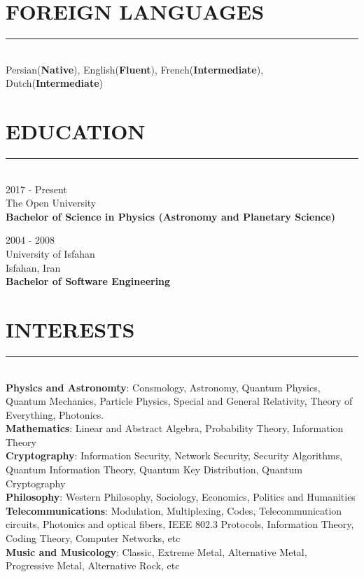 \documentclass[10pt,a4paper]{article}
\begin{document}

\section{FOREIGN LANGUAGES}
\noindent \rule {5.5cm}{0.4pt} \\
    Persian(\textbf{Native}),
    English(\textbf{Fluent}),
    French(\textbf{Intermediate}),
    Dutch(\textbf{Intermediate})

\section{EDUCATION}
\noindent \rule {3.0cm}{0.4pt} \\
\textbullet \hspace{0.1cm} 2017 - Present \\
The Open University \\
\textbf{Bachelor of Science in Physics (Astronomy and Planetary Science)}
\vspace{0.3cm}

\noindent \textbullet \hspace{0.1cm}  2004 - 2008 \\
University of Isfahan \\
Isfahan, Iran \\
\textbf{Bachelor of Software Engineering}


\section{INTERESTS}
\noindent \rule {2.9cm}{0.4pt} \\
\textbullet \hspace{0.1cm} \textbf{Physics and Astronomty}: Consmology, Astronomy, Quantum Physics, Quantum Mechanics, Particle Physics, Special and General Relativity, Theory of Everything, Photonics. \\
\textbullet \hspace{0.1cm} \textbf{Mathematics}: Linear and Abstract Algebra, Probability Theory, Information Theory \\
\textbullet \hspace{0.1cm} \textbf{Cryptography}: Information Security, Network Security, Security Algorithms, Quantum Information Theory, Quantum Key Distribution, Quantum Cryptography \\
\textbullet \hspace{0.1cm} \textbf{Philosophy}: Western Philosophy, Sociology, Economics, Politics and Humanities \\
\textbullet \hspace{0.1cm} \textbf{Telecommunications}: Modulation, Multiplexing, Codes, Telecommunication circuits, Photonics and optical fibers, IEEE 802.3 Protocols, Information Theory, Coding Theory, Computer Networks, etc \\
\textbullet \hspace{0.1cm} \textbf{Music and Musicology}: Classic, Extreme Metal, Alternative Metal, Progressive Metal, Alternative Rock, etc
\end{document}
